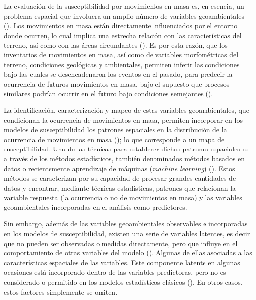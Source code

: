 \documentclass[
  manuscript=article,  
  layout=preprint,  
  year=2023,
  volume=0,
]{format}
\begin{document}
La evaluación de la susceptibilidad por movimientos en masa es, en esencia, un problema espacial que involucra un amplio número de variables geoambientales (\cite{reichenbach2018review}). Los movimientos en masa están directamente influenciados por el entorno donde ocurren, lo cual implica una estrecha relación con las características del terreno, así como con las áreas circundantes (\cite{soeters1996}). Es por esta razón, que los inventarios de movimientos en masa, así como de variables morfométricas del terreno, condiciones geológicas y ambientales, permiten inferir las condiciones bajo las cuales se desencadenaron los eventos en el pasado, para predecir la ocurrencia de futuros movimientos en masa, bajo el supuesto que procesos similares podrían ocurrir en el futuro bajo condiciones semejantes (\cite{dai2001assessment, soeters1996slope}).

La identificación, caracterización y mapeo de estas variables geoambientales, que condicionan la ocurrencia de movimientos en masa, permiten incorporar en los modelos de susceptibilidad los patrones espaciales en la distribución de la ocurrencia de movimientos en masa (\cite{reichenbach2018review}); lo que corresponde a un mapa de susceptibilidad. Una de las técnicas para establecer dichos patrones espaciales es a través de los métodos estadísticos, también denominados métodos basados en datos o recientemente aprendizaje de máquinas (\textit{machine learning}) (\cite{korup2014landslide}). Estos métodos se caracterizan por su capacidad de procesar grandes cantidades de datos y encontrar, mediante técnicas estadísticas, patrones que relacionan la variable respuesta (la ocurrencia o no de movimientos en masa) y las variables geoambientales incorporadas en el análisis como predictores.

Sin embargo, además de las variables geoambientales observables e incorporadas en los modelos de susceptibilidad, existen una serie de variables latentes, es decir que no pueden ser observadas o medidas directamente, pero que influye en el comportamiento de otras variables del modelo (\cite{lombardo2019geostatistical}). Algunas de ellas asociadas a las características espaciales de las variables. Este componente latente en algunas ocasiones está incorporado dentro de las variables predictoras, pero no es considerado o permitido en los modelos estadísticos clásicos (\cite{anselin1988spatial, cressie1988spatial, lesage2011pitfalls}). En otros casos, estos factores simplemente se omiten.
\end{document}

